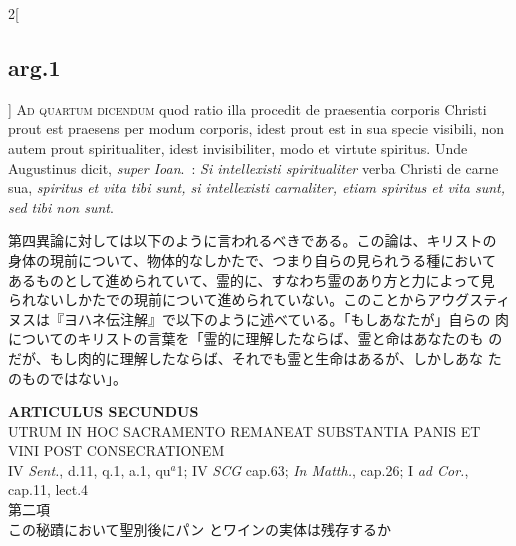 \documentclass[paper=a4paper,fontsize=10pt,jafontsize=9pt,titlepage]{jlreq}
\begin{document}
\begin{paracol}{2}[\subsection{arg.1}]
{\scshape Ad quartum dicendum} quod ratio illa procedit de praesentia
corporis Christi prout est praesens per modum corporis, idest prout
est in sua specie visibili, non autem prout spiritualiter, idest
invisibiliter, modo et virtute spiritus. Unde Augustinus dicit,
{\itshape super Ioan}.~: {\itshape Si intellexisti spiritualiter}
verba Christi de carne sua, {\itshape spiritus et vita tibi sunt, si
intellexisti carnaliter, etiam spiritus et vita sunt, sed tibi non
sunt}.

\switchcolumn

第四異論に対しては以下のように言われるべきである。この論は、キリストの
身体の現前について、物体的なしかたで、つまり自らの見られうる種において
あるものとして進められていて、霊的に、すなわち霊のあり方と力によって見
られないしかたでの現前について進められていない。このことからアウグスティ
ヌスは『ヨハネ伝注解』で以下のように述べている。「もしあなたが」自らの
肉についてのキリストの言葉を「霊的に理解したならば、霊と命はあなたのも
のだが、もし肉的に理解したならば、それでも霊と生命はあるが、しかしあな
たのものではない」。

\end{paracol}
\newpage
{}
{}
\setcounter{section}{2}
\setcounter{subsection}{0}


\begin{center}
{\Large {\bfseries ARTICULUS SECUNDUS}}\\ {\large UTRUM IN HOC SACRAMENTO
REMANEAT SUBSTANTIA PANIS ET VINI POST CONSECRATIONEM}\\
{\footnotesize IV {\itshape Sent.}, d.11, q.1, a.1, qu$^{a}$1; IV
{\itshape SCG} cap.63; {\itshape In Matth.}, cap.26; I {\itshape ad
Cor.}, cap.11, lect.4}\\ {\Large 第二項\\この秘蹟において聖別後にパン
とワインの実体は残存するか}
\end{center}
\end{document}
